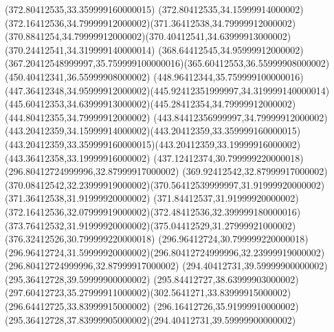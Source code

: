 {{	\lineto(372.80412535,33.359999160000015)
	\curveto(372.80412535,34.15999914000002)(372.16412536,34.79999912000002)(371.36412538,34.79999912000002)
	\curveto(370.8841254,34.79999912000002)(370.40412541,34.63999913000002)(370.24412541,34.319999140000014)
	\curveto(368.64412545,34.95999912000002)(367.20412548999997,35.759999100000016)(365.60412553,36.55999908000002)
	\lineto(450.40412341,36.55999908000002)
	\curveto(448.96412344,35.759999100000016)(447.36412348,34.95999912000002)(445.92412351999997,34.319999140000014)
	\curveto(445.60412353,34.63999913000002)(445.28412354,34.79999912000002)(444.80412355,34.79999912000002)
	\curveto(443.84412356999997,34.79999912000002)(443.20412359,34.15999914000002)(443.20412359,33.359999160000015)
	\curveto(443.20412359,33.359999160000015)(443.20412359,33.19999916000002)(443.36412358,33.19999916000002)
	\lineto(437.12412374,30.799999220000018)
	\closepath
	\moveto(296.80412724999996,32.87999917000002)
	\lineto(369.92412542,32.87999917000002)
	\curveto(370.08412542,32.23999919000002)(370.56412539999997,31.91999920000002)(371.36412538,31.91999920000002)
	\curveto(371.84412537,31.91999920000002)(372.16412536,32.07999919000002)(372.48412536,32.399999180000016)
	\curveto(373.76412532,31.91999920000002)(375.04412529,31.27999921000002)(376.32412526,30.799999220000018)
	\lineto(296.96412724,30.799999220000018)
	\curveto(296.96412724,31.59999920000002)(296.80412724999996,32.23999919000002)(296.80412724999996,32.87999917000002)
	\closepath
	\moveto(294.40412731,39.59999900000002)
	\lineto(295.36412728,39.59999900000002)
	\curveto(295.84412727,38.63999903000002)(297.60412723,35.27999911000002)(302.5641271,33.83999915000002)
	\lineto(296.64412725,33.83999915000002)
	\curveto(296.16412726,35.91999910000002)(295.36412728,37.83999905000002)(294.40412731,39.59999900000002)
	\closepath
}
}



